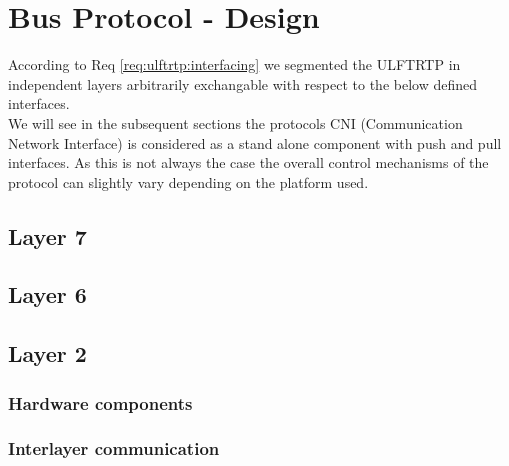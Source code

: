 \section{Bus Protocol - Design}
\label{sec:bus:design}

According to Req \ref{req:ulftrtp:interfacing} we segmented the ULFTRTP in independent layers arbitrarily exchangable with respect to the below defined interfaces.\\

We will see in the subsequent sections the protocols CNI (Communication Network Interface) is considered as a stand alone component with push and pull interfaces.
As this is not always the case the overall control mechanisms of the protocol can slightly vary depending on the platform used.\\




\subsection{Layer 7}

\subsection{Layer 6}

\subsection{Layer 2}



\subsubsection{Hardware components}
\subsubsection{Interlayer communication}

